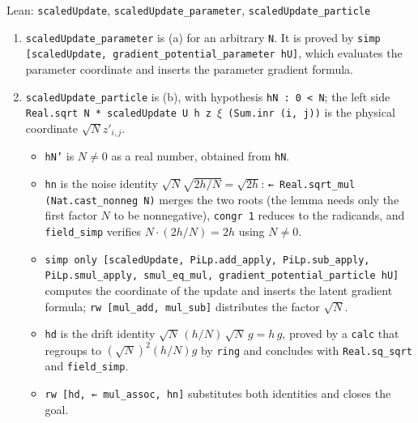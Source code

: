 \documentclass[11pt,a4paper]{report}
\begin{document}
\begin{leanbox}{Lean: \texttt{scaledUpdate}, \texttt{scaledUpdate\_\allowbreak{}parameter}, \texttt{scaledUpdate\_\allowbreak{}particle}}
\begin{enumerate}


\item \texttt{scaled\allowbreak{}Update\_\allowbreak{}parameter} is (a) for an arbitrary \texttt{N}. It is proved by \texttt{simp [scaled\allowbreak{}Update, gradient\_\allowbreak{}potential\_\allowbreak{}parameter h\allowbreak{}U]}, which evaluates the parameter coordinate and inserts the parameter gradient formula.

\item \texttt{scaled\allowbreak{}Update\_\allowbreak{}particle} is (b), with hypothesis \texttt{h\allowbreak{}N : 0 < N}; the left side \texttt{Real.\allowbreak{}sqrt N * scaled\allowbreak{}Update U h z \ensuremath{\xi} (Sum.\allowbreak{}inr (i, j))} is the physical coordinate \(\sqrt Nz'_{i,j}\).

\begin{itemize}


\item \texttt{h\allowbreak{}N'} is \(N\ne0\) as a real number, obtained from \texttt{h\allowbreak{}N}.

\item \texttt{hn} is the noise identity \(\sqrt N\sqrt{2h/N}=\sqrt{2h}\): \texttt{← Real.\allowbreak{}sqrt\_\allowbreak{}mul (Nat.\allowbreak{}cast\_\allowbreak{}nonneg N)} merges the two roots (the lemma needs only the first factor \(N\) to be nonnegative), \texttt{congr 1} reduces to the radicands, and \texttt{field\_\allowbreak{}simp} verifies \(N\cdot(2h/N)=2h\) using \(N\ne0\).

\item \texttt{simp only [scaled\allowbreak{}Update, Pi\allowbreak{}Lp.\allowbreak{}add\_\allowbreak{}apply, Pi\allowbreak{}Lp.\allowbreak{}sub\_\allowbreak{}apply, Pi\allowbreak{}Lp.\allowbreak{}smul\_\allowbreak{}apply, smul\_\allowbreak{}eq\_\allowbreak{}mul, gradient\_\allowbreak{}potential\_\allowbreak{}particle h\allowbreak{}U]} computes the coordinate of the update and inserts the latent gradient formula; \texttt{rw [mul\_\allowbreak{}add, mul\_\allowbreak{}sub]} distributes the factor \(\sqrt N\).

\item \texttt{hd} is the drift identity \(\sqrt N\,(h/N)\,\sqrt N\,g=h\,g\), proved by a \texttt{calc} that regroups to \((\sqrt N)^2(h/N)g\) by \texttt{ring} and concludes with \texttt{Real.\allowbreak{}sq\_\allowbreak{}sqrt} and \texttt{field\_\allowbreak{}simp}.

\item \texttt{rw [hd, ← mul\_\allowbreak{}assoc, hn]} substitutes both identities and closes the goal.

\end{itemize}


\end{enumerate}
\end{leanbox}
\end{document}
